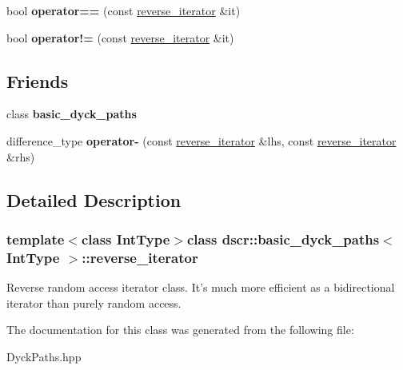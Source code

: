\begin{DoxyCompactItemize}
\item 
\hypertarget{classdscr_1_1basic__dyck__paths_1_1reverse__iterator_a6b563b93c9d7cb81c929370eeace8d8b}{bool {\bfseries operator==} (const \hyperlink{classdscr_1_1basic__dyck__paths_1_1reverse__iterator}{reverse\-\_\-iterator} \&it)}\label{classdscr_1_1basic__dyck__paths_1_1reverse__iterator_a6b563b93c9d7cb81c929370eeace8d8b}

\item 
\hypertarget{classdscr_1_1basic__dyck__paths_1_1reverse__iterator_a6527f3e5d4f9afc9d6161c5be5657704}{bool {\bfseries operator!=} (const \hyperlink{classdscr_1_1basic__dyck__paths_1_1reverse__iterator}{reverse\-\_\-iterator} \&it)}\label{classdscr_1_1basic__dyck__paths_1_1reverse__iterator_a6527f3e5d4f9afc9d6161c5be5657704}

\end{DoxyCompactItemize}
\subsection*{Friends}
\begin{DoxyCompactItemize}
\item 
\hypertarget{classdscr_1_1basic__dyck__paths_1_1reverse__iterator_a3dd4f1061ed68889e2068166aee9248a}{class {\bfseries basic\-\_\-dyck\-\_\-paths}}\label{classdscr_1_1basic__dyck__paths_1_1reverse__iterator_a3dd4f1061ed68889e2068166aee9248a}

\item 
\hypertarget{classdscr_1_1basic__dyck__paths_1_1reverse__iterator_a46fe9efd66cb5e2a2e89a93f2e060b82}{difference\-\_\-type {\bfseries operator-\/} (const \hyperlink{classdscr_1_1basic__dyck__paths_1_1reverse__iterator}{reverse\-\_\-iterator} \&lhs, const \hyperlink{classdscr_1_1basic__dyck__paths_1_1reverse__iterator}{reverse\-\_\-iterator} \&rhs)}\label{classdscr_1_1basic__dyck__paths_1_1reverse__iterator_a46fe9efd66cb5e2a2e89a93f2e060b82}

\end{DoxyCompactItemize}


\subsection{Detailed Description}
\subsubsection*{template$<$class Int\-Type$>$class dscr\-::basic\-\_\-dyck\-\_\-paths$<$ Int\-Type $>$\-::reverse\-\_\-iterator}

Reverse random access iterator class. It's much more efficient as a bidirectional iterator than purely random access. 

The documentation for this class was generated from the following file\-:\begin{DoxyCompactItemize}
\item 
Dyck\-Paths.\-hpp\end{DoxyCompactItemize}
